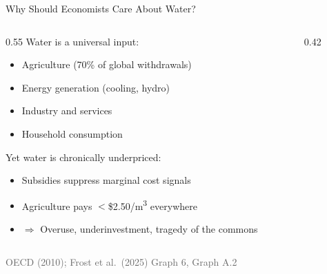 \documentclass[aspectratio=169,12pt]{beamer}
\newcommand{\source}[1]{\vfill\hfill{\tiny\textcolor{dimgray}{#1}}}
\begin{document}
\begin{frame}{Why Should Economists Care About Water?}

\begin{columns}[T]
\begin{column}{0.55\textwidth}
\vspace{0.3cm}
Water is a \alert{universal input}:
\begin{itemize}
    \item Agriculture (70\% of global withdrawals)
    \item Energy generation (cooling, hydro)
    \item Industry and services
    \item Household consumption
\end{itemize}

\vspace{0.4cm}
Yet water is \alert{chronically underpriced}:
\begin{itemize}
    \item Subsidies suppress marginal cost signals
    \item Agriculture pays $<$\$2.50/m\textsuperscript{3} everywhere
    \item $\Rightarrow$ Overuse, underinvestment, tragedy of the commons
\end{itemize}
\end{column}

\begin{column}{0.42\textwidth}
\vspace{0.2cm}
\end{column}
\end{columns}

\source{OECD (2010); Frost et al.\ (2025) Graph 6, Graph A.2}
\end{frame}
\end{document}
